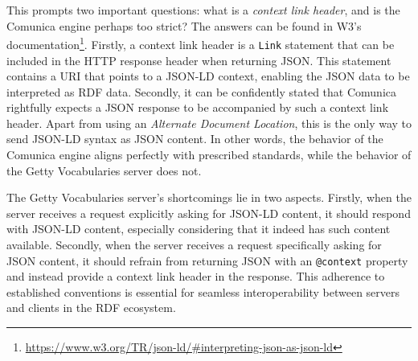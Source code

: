 This prompts two important questions: what is a \textit{context link header}, and is the Comunica engine perhaps too strict? The answers can be found in W3's documentation\footnote{\url{https://www.w3.org/TR/json-ld/\#interpreting-json-as-json-ld}}. Firstly, a context link header is a \texttt{Link} statement that can be included in the HTTP response header when returning JSON. This statement contains a URI that points to a JSON-LD context, enabling the JSON data to be interpreted as RDF data. Secondly, it can be confidently stated that Comunica rightfully expects a JSON response to be accompanied by such a context link header. Apart from using an \textit{Alternate Document Location}, this is the only way to send JSON-LD syntax as JSON content. In other words, the behavior of the Comunica engine aligns perfectly with prescribed standards, while the behavior of the Getty Vocabularies server does not. \citep{kellogg2020jsonld}

The Getty Vocabularies server's shortcomings lie in two aspects. Firstly, when the server receives a request explicitly asking for JSON-LD content, it should respond with JSON-LD content, especially considering that it indeed has such content available. Secondly, when the server receives a request specifically asking for JSON content, it should refrain from returning JSON with an \texttt{@context} property and instead provide a context link header in the response. This adherence to established conventions is essential for seamless interoperability between servers and clients in the RDF ecosystem.


